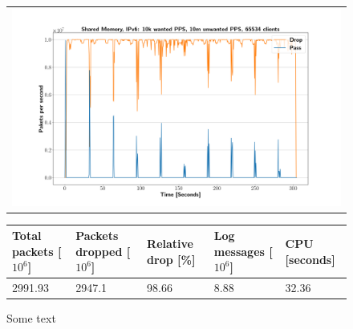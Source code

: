 \begin{figure}[p]
	\label{fig:simplefail2ban:shm:ip6:10m}
	\centering
	\scriptsize
	\begin{tabular}{c}
    	\centerline{\includegraphics[width=1.2\textwidth]{images/simplefail2ban_shm_ipv6_v10k_iv10m_c65534.png}}
	\end{tabular}
	\begin{tabular}{lllll}
		\toprule
		\textbf{Total packets [$10^6$]} & \textbf{Packets dropped [$10^6$]} & \textbf{Relative drop [\%]} & \textbf{Log messages [$10^6$]} & \textbf{CPU [seconds]} \\ \midrule 
		2991.93 & 2947.1 & 98.66 & 8.88 & 32.36 \\
		\bottomrule
	\end{tabular}
	\caption[Simplefail2ban, Shared Memory, IPv6, 10m \ac{PPS}]{Some text}
\end{figure}

